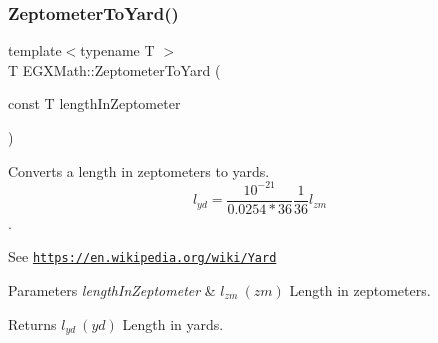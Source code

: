 \subsubsection{\texorpdfstring{Zeptometer\+To\+Yard()}{ZeptometerToYard()}}
{\footnotesize\ttfamily template$<$typename T $>$ \\
T E\+G\+X\+Math\+::\+Zeptometer\+To\+Yard (\begin{DoxyParamCaption}\item[{const T}]{length\+In\+Zeptometer }\end{DoxyParamCaption})}



Converts a length in zeptometers to yards. \[ l_{yd}= \frac{10^{-21}}{0.0254 * 36} \frac{1}{36} l_{zm} \]. 

See \href{https://en.wikipedia.org/wiki/Yard}{\tt https\+://en.\+wikipedia.\+org/wiki/\+Yard} 
\begin{DoxyParams}{Parameters}
{\em length\+In\+Zeptometer} & $ l_{zm}\ (zm)$ Length in zeptometers. \\
\hline
\end{DoxyParams}
\begin{DoxyReturn}{Returns}
$ l_{yd}\ (yd)$ Length in yards. 
\end{DoxyReturn}
